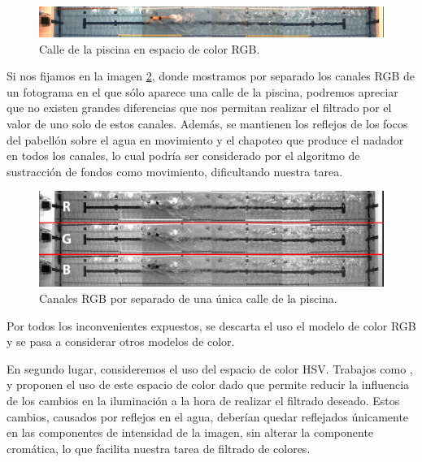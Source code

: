 \begin{figure}[h!]
    \centering
    \includegraphics[width=1\textwidth,height=1\textheight,keepaspectratio]{imagenes/parte_BS/single_lane_RGB.png}   
    \caption{Calle de la piscina en espacio de color RGB.}
    \label{fig:ejemplopiscinargb}
\end{figure}

Si nos fijamos en la imagen \ref{fig:ejemplopiscinargbcanales}, donde mostramos por separado los canales RGB de un fotograma en el que sólo aparece una calle de la piscina, podremos apreciar que no existen grandes diferencias que nos permitan realizar el filtrado por el valor de uno solo de estos canales. Además, se mantienen los reflejos de los focos del pabellón sobre el agua en movimiento y el chapoteo que produce el nadador en todos los canales, lo cual podría ser considerado por el algoritmo de sustracción de fondos como movimiento, dificultando nuestra tarea.

\begin{figure}[h!]
    \centering
    \includegraphics[width=1\textwidth,height=1\textheight,keepaspectratio]{imagenes/parte_BS/RGB_LANE.png}    
    \caption{Canales RGB por separado de una única calle de la piscina.}
    \label{fig:ejemplopiscinargbcanales}
\end{figure}

Por todos los inconvenientes expuestos, se descarta el uso el modelo de color RGB y se pasa a considerar otros modelos de color. 

En segundo lugar, consideremos el uso del espacio de color HSV. Trabajos como \cite{hsvforswimmerdetection}, \cite{pielespacioscolor} y \cite{swimmerartii} proponen el uso de este espacio de color dado que permite reducir la influencia de los cambios en la iluminación a la hora de realizar el filtrado deseado. Estos cambios, causados por reflejos en el agua, deberían quedar reflejados únicamente en las componentes de intensidad de la imagen, sin alterar la componente cromática, lo que facilita nuestra tarea de filtrado de colores. 

